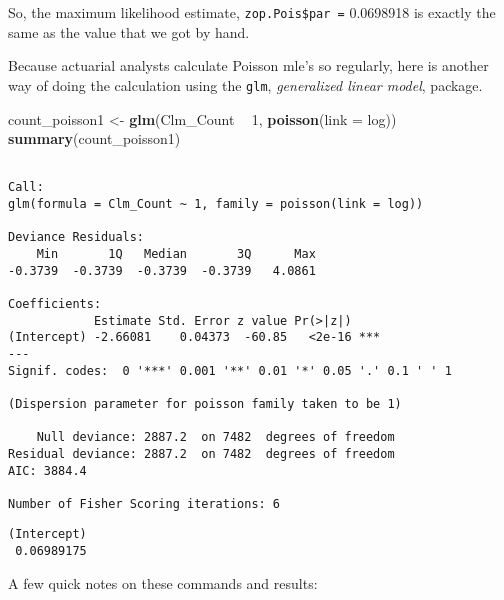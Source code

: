 \documentclass[]{book}
\newenvironment{Shaded}{\begin{snugshade}}{\end{snugshade}}
\newcommand{\KeywordTok}[1]{\textcolor[rgb]{0.13,0.29,0.53}{\textbf{#1}}}
\newcommand{\DataTypeTok}[1]{\textcolor[rgb]{0.13,0.29,0.53}{#1}}
\newcommand{\DecValTok}[1]{\textcolor[rgb]{0.00,0.00,0.81}{#1}}
\newcommand{\StringTok}[1]{\textcolor[rgb]{0.31,0.60,0.02}{#1}}
\newcommand{\OperatorTok}[1]{\textcolor[rgb]{0.81,0.36,0.00}{\textbf{#1}}}
\newcommand{\NormalTok}[1]{#1}
\theoremstyle{definition}
\theoremstyle{definition}
\theoremstyle{definition}
\theoremstyle{remark}
\begin{document}
So, the maximum likelihood estimate, \texttt{zop.Pois\$par\ =} 0.0698918
is exactly the same as the value that we got by hand.

Because actuarial analysts calculate Poisson mle's so regularly, here is
another way of doing the calculation using the \texttt{glm},
\emph{generalized linear model}, package.

\begin{Shaded}
\begin{Highlighting}[]
\NormalTok{count_poisson1 <-}\StringTok{ }\KeywordTok{glm}\NormalTok{(Clm_Count }\OperatorTok{~}\StringTok{ }\DecValTok{1}\NormalTok{, }\KeywordTok{poisson}\NormalTok{(}\DataTypeTok{link =}\NormalTok{ log))}
\KeywordTok{summary}\NormalTok{(count_poisson1)}
\end{Highlighting}
\end{Shaded}

\begin{verbatim}

Call:
glm(formula = Clm_Count ~ 1, family = poisson(link = log))

Deviance Residuals: 
    Min       1Q   Median       3Q      Max  
-0.3739  -0.3739  -0.3739  -0.3739   4.0861  

Coefficients:
            Estimate Std. Error z value Pr(>|z|)    
(Intercept) -2.66081    0.04373  -60.85   <2e-16 ***
---
Signif. codes:  0 '***' 0.001 '**' 0.01 '*' 0.05 '.' 0.1 ' ' 1

(Dispersion parameter for poisson family taken to be 1)

    Null deviance: 2887.2  on 7482  degrees of freedom
Residual deviance: 2887.2  on 7482  degrees of freedom
AIC: 3884.4

Number of Fisher Scoring iterations: 6
\end{verbatim}

\begin{Shaded}
\end{Shaded}

\begin{verbatim}
(Intercept) 
 0.06989175 
\end{verbatim}

A few quick notes on these commands and results:
\end{document}
